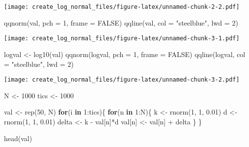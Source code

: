 \documentclass[
]{article}
\newenvironment{Shaded}{\begin{snugshade}}{\end{snugshade}}
\newcommand{\AttributeTok}[1]{\textcolor[rgb]{0.77,0.63,0.00}{#1}}
\newcommand{\ConstantTok}[1]{\textcolor[rgb]{0.00,0.00,0.00}{#1}}
\newcommand{\ControlFlowTok}[1]{\textcolor[rgb]{0.13,0.29,0.53}{\textbf{#1}}}
\newcommand{\DecValTok}[1]{\textcolor[rgb]{0.00,0.00,0.81}{#1}}
\newcommand{\FloatTok}[1]{\textcolor[rgb]{0.00,0.00,0.81}{#1}}
\newcommand{\FunctionTok}[1]{\textcolor[rgb]{0.00,0.00,0.00}{#1}}
\newcommand{\NormalTok}[1]{#1}
\newcommand{\OtherTok}[1]{\textcolor[rgb]{0.56,0.35,0.01}{#1}}
\newcommand{\SpecialCharTok}[1]{\textcolor[rgb]{0.00,0.00,0.00}{#1}}
\newcommand{\StringTok}[1]{\textcolor[rgb]{0.31,0.60,0.02}{#1}}
\begin{document}
\texttt{[image: create\_log\_normal\_files/figure-latex/unnamed-chunk-2-2.pdf]}

\begin{Shaded}
\begin{Highlighting}[]
\FunctionTok{qqnorm}\NormalTok{(val, }\AttributeTok{pch =} \DecValTok{1}\NormalTok{, }\AttributeTok{frame =} \ConstantTok{FALSE}\NormalTok{)}
\FunctionTok{qqline}\NormalTok{(val, }\AttributeTok{col =} \StringTok{"steelblue"}\NormalTok{, }\AttributeTok{lwd =} \DecValTok{2}\NormalTok{)}
\end{Highlighting}
\end{Shaded}

\texttt{[image: create\_log\_normal\_files/figure-latex/unnamed-chunk-3-1.pdf]}

\begin{Shaded}
\begin{Highlighting}[]
\NormalTok{logval }\OtherTok{\textless{}{-}} \FunctionTok{log10}\NormalTok{(val)}
\FunctionTok{qqnorm}\NormalTok{(logval, }\AttributeTok{pch =} \DecValTok{1}\NormalTok{, }\AttributeTok{frame =} \ConstantTok{FALSE}\NormalTok{)}
\FunctionTok{qqline}\NormalTok{(logval, }\AttributeTok{col =} \StringTok{"steelblue"}\NormalTok{, }\AttributeTok{lwd =} \DecValTok{2}\NormalTok{)}
\end{Highlighting}
\end{Shaded}

\texttt{[image: create\_log\_normal\_files/figure-latex/unnamed-chunk-3-2.pdf]}

\begin{Shaded}
\begin{Highlighting}[]
\NormalTok{N }\OtherTok{\textless{}{-}} \DecValTok{1000}
\NormalTok{tics }\OtherTok{\textless{}{-}} \DecValTok{1000}

\NormalTok{val }\OtherTok{\textless{}{-}} \FunctionTok{rep}\NormalTok{(}\DecValTok{50}\NormalTok{, N)}
\ControlFlowTok{for}\NormalTok{(i }\ControlFlowTok{in} \DecValTok{1}\SpecialCharTok{:}\NormalTok{tics)\{}
  \ControlFlowTok{for}\NormalTok{(n }\ControlFlowTok{in} \DecValTok{1}\SpecialCharTok{:}\NormalTok{N)\{}
\NormalTok{    k }\OtherTok{\textless{}{-}} \FunctionTok{rnorm}\NormalTok{(}\DecValTok{1}\NormalTok{, }\DecValTok{1}\NormalTok{, }\FloatTok{0.01}\NormalTok{)}
\NormalTok{    d }\OtherTok{\textless{}{-}} \FunctionTok{rnorm}\NormalTok{(}\DecValTok{1}\NormalTok{, }\DecValTok{1}\NormalTok{, }\FloatTok{0.01}\NormalTok{)}
\NormalTok{    delta }\OtherTok{\textless{}{-}}\NormalTok{ k }\SpecialCharTok{{-}}\NormalTok{ val[n]}\SpecialCharTok{*}\NormalTok{d}
\NormalTok{    val[n] }\OtherTok{\textless{}{-}}\NormalTok{ val[n] }\SpecialCharTok{+}\NormalTok{ delta}
\NormalTok{  \}}
\NormalTok{\}}

\FunctionTok{head}\NormalTok{(val)}
\end{Highlighting}
\end{Shaded}
\end{document}
